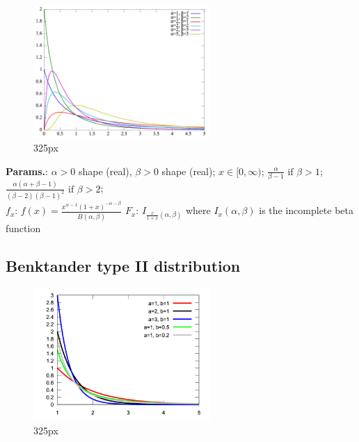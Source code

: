     \begin{figure}[H]
        \centering
        \includegraphics[width=0.6\textwidth]{images/Beta prime pdf.png}
        \caption{325px}
    \end{figure}




    {\color{darkblue} \textbf{Params.}:} {$\alpha > 0$ shape (real),  $\beta > 0$ shape (real)}; {$x \in [0,\infty)\!$}; {$\frac{\alpha}{\beta-1} \text{ if } \beta>1$}; {$\frac{\alpha(\alpha+\beta-1)}{(\beta-2)(\beta-1)^2} \text{ if } \beta>2$};\hspace{0.5cm}\\{\color{darkblue} \textbf{$f_x$}:} {$f(x) = \frac{x^{\alpha-1} (1+x)^{-\alpha -\beta}}{B(\alpha,\beta)}\!$}{\color{darkblue} \textbf{$F_x$}:} {$ I_{\frac{x}{1+x}(\alpha,\beta) }$ where $I_x(\alpha,\beta)$ is the incomplete beta function}



    
        
\subsection{Benktander type II distribution}


    \begin{figure}[H]
        \centering
        \includegraphics[width=0.6\textwidth]{images/Benktander2PDF.png}
        \caption{325px}
    \end{figure}




